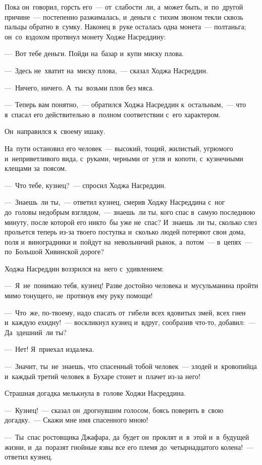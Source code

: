 \documentclass[12pt,a4paper]{book}
\begin{document}
Пока он~говорил, горсть его~— от~слабости~ли, а~может быть, и~по~другой причине~— постепенно разжималась, и~деньги с~тихим звоном текли сквозь пальцы обратно в~сумку. Наконец в~руке осталась одна монета~— полтаньга; он~со~вздохом протянул монету Ходже Насреддину:

—~Вот тебе деньги. Пойди на~базар и~купи миску плова.

—~Здесь не~хватит на~миску плова,~— сказал Ходжа Насреддин.

—~Ничего, ничего. А~ты~возьми плов без мяса.

—~Теперь вам понятно,~— обратился Ходжа Насреддин к~остальным,~— что я~спасал его действительно в~полном соответствии с~его характером.

Он~направился к~своему ишаку.

На~пути остановил его человек~— высокий, тощий, жилистый, угрюмого и~неприветливого вида, с~руками, черными от~угля и~копоти, с~кузнечными клещами за~поясом.

—~Что тебе, кузнец?~— спросил Ходжа Насреддин.

—~Знаешь~ли ты,~— ответил кузнец, смерив Ходжу Насреддина с~ног до~головы недобрым взглядом,~— знаешь~ли ты, кого спас в~самую последнюю минуту, после которой его никто~бы уже не~спас? И~знаешь~ли ты, сколько слез прольется теперь из-за твоего поступка и~сколько людей потеряют свои дома, поля и~виноградники и~пойдут на~невольничий рынок, а~потом~— в~цепях~— по~Большой Хивинской дороге?

Ходжа Насреддин воззрился на~него с~удивлением:

—~Я~не~понимаю тебя, кузнец! Разве достойно человека и~мусульманина пройти мимо тонущего, не~протянув ему руку помощи!

—~Что~же, по-твоему, надо спасать от~гибели всех ядовитых змей, всех гиен и~каждую ехидну!~— воскликнул кузнец и~вдруг, сообразив что-то, добавил:~— Да~здешний~ли ты?

—~Нет! Я~приехал издалека.

—~Значит, ты~не~знаешь, что спасенный тобой человек~— злодей и~кровопийца и~каждый третий человек в~Бухаре стонет и~плачет из-за него!

Страшная догадка мелькнула в~голове Ходжи Насреддина.

—~Кузнец!~— сказал он~дрогнувшим голосом, боясь поверить в~свою догадку.~— Скажи мне имя спасенного мною!

—~Ты~спас ростовщика Джафара, да~будет он~проклят и~в~этой и~в~будущей жизни, и~да~поразят гнойные язвы все его племя до~четырнадцатого колена!~— ответил кузнец.
\end{document}

